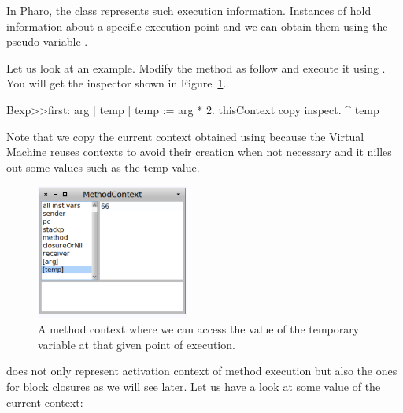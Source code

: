 \documentclass[a4paper,10pt,twoside]{book}
\begin{document}
In Pharo, the class  represents such execution information. Instances of  hold information about a specific execution point and we can obtain them using the pseudo-variable .

Let us look at an example. Modify the method as follow and execute it using .
You will get the inspector shown in Figure~\ref{oneContext}.

\begin{code}
Bexp>>first: arg
	| temp |
	temp := arg * 2.
	thisContext copy inspect.
	^ temp
\end{code}

Note that we copy the current context obtained using  because the Virtual Machine reuses contexts to avoid their creation when not necessary and it nilles out some values such as the temp value.

\begin{figure}[!h]
\begin{center}\includegraphics[width=5cm]{OneContext}
\caption{A method context where we can access the value of the temporary variable  at that given point of execution.\label{oneContext}}
\end{center}
\end{figure}

 does not only represent activation context of method execution but also
the ones for block closures as we will see later. Let us have a look at some value of the current context:
\end{document}
